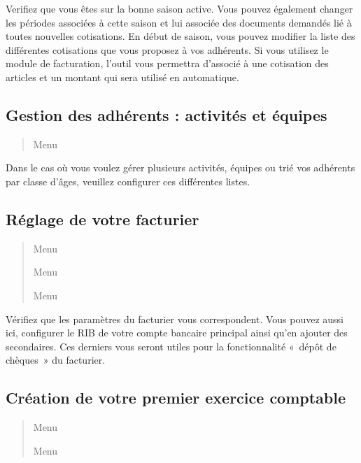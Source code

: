 \documentclass[a4paper,10pt,oneside,french]{sphinxmanual}
\begin{document}
Verifiez que vous êtes sur la bonne saison active. Vous pouvez également changer les périodes associées à cette saison et lui associée des documents demandés lié à toutes nouvelles cotisations.
En début de saison, vous pouvez modifier la liste des différentes cotisations que vous proposez à vos adhérents.
Si vous utilisez le module de facturation, l’outil vous permettra d’associé à une cotisation des articles et un montant qui sera utilisé en automatique.


\subsection{Gestion des adhérents : activités et équipes}
\label{\detokenize{asso/first_step:gestion-des-adherents-activites-et-equipes}}\begin{quote}

Menu 
\end{quote}

Dans le cas où vous voulez gérer plusieurs activités, équipes ou trié vos adhérents par classe d’âges, veuillez configurer ces différentes listes.


\subsection{Réglage de votre facturier}
\label{\detokenize{asso/first_step:reglage-de-votre-facturier}}\begin{quote}

Menu 

Menu 

Menu 
\end{quote}

Vérifiez que les paramètres du facturier vous correspondent.
Vous pouvez aussi ici, configurer le RIB de votre compte bancaire principal ainsi qu’en ajouter des secondaires.
Ces derniers vous seront utiles pour la fonctionnalité « dépôt de chèques » du facturier.


\subsection{Création de votre premier exercice comptable}
\label{\detokenize{asso/first_step:creation-de-votre-premier-exercice-comptable}}\begin{quote}

Menu 

Menu 
\end{quote}
\end{document}
